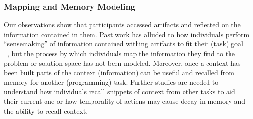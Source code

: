 \subsubsection{Mapping and Memory Modeling}
Our observations show that participants accessed artifacts and reflected on the information contained in them. Past work has alluded to how individuals perform ``sensemaking'' of information contained withing artifacts to fit their (task) goal ~\cite{Grigoreanu:2012}, but the process by which individuals map the information they find to the problem or solution space has not been modeled. Moreover, once a context has been built parts of the context (information) can be useful and recalled from memory for another (programming) task. Further studies are needed to understand how individuals recall snippets of context from other tasks to aid their current one or how temporality of actions may cause decay in memory and the ability to recall context.



